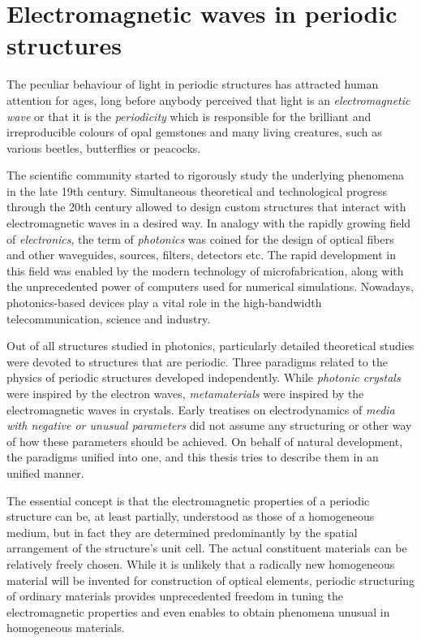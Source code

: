 
\section{Electromagnetic waves in periodic structures} %
The peculiar behaviour of light in periodic structures has attracted human attention for ages, long before anybody perceived that light is an \textit{electromagnetic wave} or that it is the \textit{periodicity} which is responsible for the brilliant and irreproducible colours of opal gemstones and many living creatures, such as various beetles, butterflies or peacocks. 

The scientific community started to rigorously study the underlying phenomena in the late 19th century.
Simultaneous theoretical and technological progress through the 20th century allowed to design custom structures that interact with electromagnetic waves in a desired way. In analogy with the rapidly growing field of \textit{electronics}, the term of \textit{photonics} was coined for the design of optical fibers and other waveguides, sources, filters, detectors etc. The rapid development in this field was enabled by the modern technology of microfabrication, along with the unprecedented power of computers used for numerical simulations. Nowadays, photonics-based devices play a vital role in the high-bandwidth telecommunication, science and industry.

Out of all structures studied in photonics, particularly detailed theoretical studies were devoted to structures that are periodic. Three paradigms related to the physics of periodic structures developed independently. While \textit{photonic crystals} were inspired by the electron waves, \textit{metamaterials} were inspired by the electromagnetic waves in crystals. Early treatises on electrodynamics of \textit{media with negative or unusual parameters} did not assume any structuring or other way of how these parameters should be achieved. On behalf of natural development, the paradigms unified into one, and this thesis tries to describe them in an unified manner.  %

The essential concept is that the electromagnetic properties of a periodic structure can be, at least partially, understood as those of a homogeneous medium, but in fact they are determined predominantly by the spatial arrangement of the structure's unit cell. The actual constituent materials can be relatively freely chosen. While it is unlikely that a radically new homogeneous material will be invented for construction of optical elements, periodic structuring of ordinary materials provides unprecedented freedom in tuning the electromagnetic properties and even enables to obtain phenomena unusual in homogeneous materials.  %

